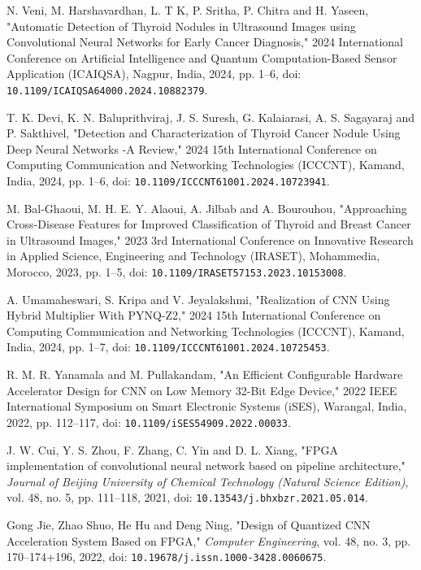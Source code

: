 \documentclass[12pt, a4paper]{report}
\begin{document}
\begin{thebibliography}{99}
 N. Veni, M. Harshavardhan, L. T K, P. Sritha, P. Chitra and H. Yaseen, "Automatic Detection of Thyroid Nodules in Ultrasound Images using Convolutional Neural Networks for Early Cancer Diagnosis," 2024 International Conference on Artificial Intelligence and Quantum Computation-Based Sensor Application (ICAIQSA), Nagpur, India, 2024, pp. 1--6, doi: \texttt{10.1109/ICAIQSA64000.2024.10882379}.

 T. K. Devi, K. N. Baluprithviraj, J. S. Suresh, G. Kalaiarasi, A. S. Sagayaraj and P. Sakthivel, "Detection and Characterization of Thyroid Cancer Nodule Using Deep Neural Networks -A Review," 2024 15th International Conference on Computing Communication and Networking Technologies (ICCCNT), Kamand, India, 2024, pp. 1--6, doi: \texttt{10.1109/ICCCNT61001.2024.10723941}.

 M. Bal-Ghaoui, M. H. E. Y. Alaoui, A. Jilbab and A. Bourouhou, "Approaching Cross-Disease Features for Improved Classification of Thyroid and Breast Cancer in Ultrasound Images," 2023 3rd International Conference on Innovative Research in Applied Science, Engineering and Technology (IRASET), Mohammedia, Morocco, 2023, pp. 1--5, doi: \texttt{10.1109/IRASET57153.2023.10153008}.

 A. Umamaheswari, S. Kripa and V. Jeyalakshmi, "Realization of CNN Using Hybrid Multiplier With PYNQ-Z2," 2024 15th International Conference on Computing Communication and Networking Technologies (ICCCNT), Kamand, India, 2024, pp. 1--7, doi: \texttt{10.1109/ICCCNT61001.2024.10725453}.

 R. M. R. Yanamala and M. Pullakandam, "An Efficient Configurable Hardware Accelerator Design for CNN on Low Memory 32-Bit Edge Device," 2022 IEEE International Symposium on Smart Electronic Systems (iSES), Warangal, India, 2022, pp. 112--117, doi: \texttt{10.1109/iSES54909.2022.00033}.

 J. W. Cui, Y. S. Zhou, F. Zhang, C. Yin and D. L. Xiang, "FPGA implementation of convolutional neural network based on pipeline architecture," \textit{Journal of Beijing University of Chemical Technology (Natural Science Edition)}, vol. 48, no. 5, pp. 111--118, 2021, doi: \texttt{10.13543/j.bhxbzr.2021.05.014}.

 Gong Jie, Zhao Shuo, He Hu and Deng Ning, "Design of Quantized CNN Acceleration System Based on FPGA," \textit{Computer Engineering}, vol. 48, no. 3, pp. 170--174+196, 2022, doi: \texttt{10.19678/j.issn.1000-3428.0060675}.

\end{thebibliography}
\end{document}
